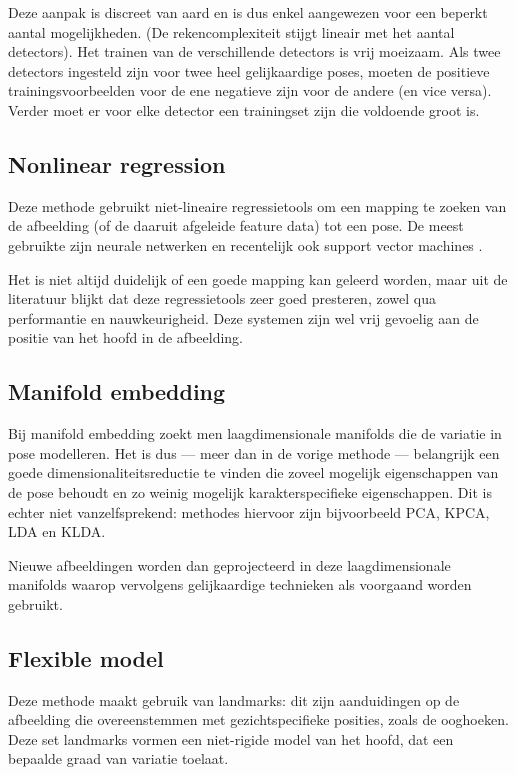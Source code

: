 \documentclass[a4paper,dutch,11pt,]{scrartcl}
\begin{document}
Deze aanpak is discreet van aard en is dus enkel aangewezen voor een beperkt aantal mogelijkheden. (De rekencomplexiteit stijgt lineair met het aantal detectors). Het trainen van de verschillende detectors is vrij moeizaam. Als twee detectors ingesteld zijn voor twee heel gelijkaardige poses, moeten de positieve trainingsvoorbeelden voor de ene negatieve zijn voor de andere (en vice versa). Verder moet er voor elke detector een trainingset zijn die voldoende groot is. %

\subsection{Nonlinear regression} 
Deze methode gebruikt niet-lineaire regressietools om een mapping te zoeken van de afbeelding (of de daaruit afgeleide feature data) tot een pose. De meest gebruikte zijn neurale netwerken en recentelijk ook support vector machines \cite{blockeel}. 

Het is niet altijd duidelijk of een goede mapping kan geleerd worden, maar uit de literatuur blijkt dat deze regressietools zeer goed presteren, zowel qua performantie en nauwkeurigheid. Deze systemen zijn wel vrij gevoelig aan de positie van het hoofd in de afbeelding. 

\subsection{Manifold embedding}
Bij manifold embedding zoekt men laagdimensionale manifolds die de variatie in pose modelleren. Het is dus --- meer dan in de vorige methode --- belangrijk een goede dimensionaliteitsreductie te vinden die zoveel mogelijk eigenschappen van de pose behoudt en zo weinig mogelijk karakterspecifieke eigenschappen. Dit is echter niet vanzelfsprekend: methodes hiervoor zijn bijvoorbeeld PCA, KPCA, LDA en KLDA.

Nieuwe afbeeldingen worden dan geprojecteerd in deze laagdimensionale manifolds waarop vervolgens gelijkaardige technieken als voorgaand worden gebruikt.

\subsection{Flexible model}
Deze methode maakt gebruik van landmarks: dit zijn aanduidingen op de afbeelding die overeenstemmen met gezichtspecifieke posities, zoals de ooghoeken. Deze set landmarks vormen een niet-rigide model van het hoofd, dat een bepaalde graad van variatie toelaat.
\end{document}
